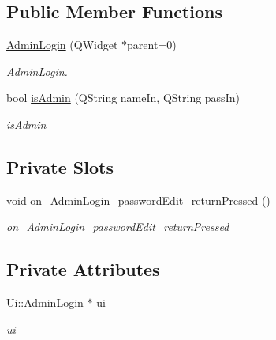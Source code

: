 \subsection*{Public Member Functions}
\begin{DoxyCompactItemize}
\item 
\hyperlink{class_admin_login_a3e1c90c550d6d7abf2a58c4919e80461}{Admin\+Login} (Q\+Widget $\ast$parent=0)
\begin{DoxyCompactList}\small\item\em \hyperlink{class_admin_login}{Admin\+Login}. \end{DoxyCompactList}\item 
bool \hyperlink{class_admin_login_a7b096251d552fafeae34a229e748398c}{is\+Admin} (Q\+String name\+In, Q\+String pass\+In)
\begin{DoxyCompactList}\small\item\em is\+Admin \end{DoxyCompactList}\end{DoxyCompactItemize}
\subsection*{Private Slots}
\begin{DoxyCompactItemize}
\item 
\mbox{\label{class_admin_login_a5baf6a698d6fd76bc59a1ab333d90a26}} 
void \hyperlink{class_admin_login_a5baf6a698d6fd76bc59a1ab333d90a26}{on\+\_\+\+Admin\+Login\+\_\+password\+Edit\+\_\+return\+Pressed} ()
\begin{DoxyCompactList}\small\item\em on\+\_\+\+Admin\+Login\+\_\+password\+Edit\+\_\+return\+Pressed \end{DoxyCompactList}\end{DoxyCompactItemize}
\subsection*{Private Attributes}
\begin{DoxyCompactItemize}
\item 
\mbox{\label{class_admin_login_afeb5001437448a10d77e2a9da45e20ac}} 
Ui\+::\+Admin\+Login $\ast$ \hyperlink{class_admin_login_afeb5001437448a10d77e2a9da45e20ac}{ui}
\begin{DoxyCompactList}\small\item\em ui \end{DoxyCompactList}\end{DoxyCompactItemize}


